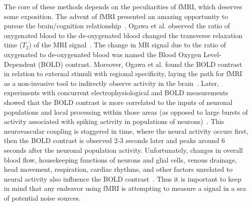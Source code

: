 \documentclass[phd,figures,tables,ackpage,abstractpage,publicabstractpage]{uithesis}
\begin{document}
The core of these methods depends on the peculiarities of fMRI, which deserves some exposition.
The advent of fMRI presented an amazing opportunity
to pursue the brain/cognition relationship~\cite{ogawa1990,Ogawa1992}.
Ogawa et al. observed the ratio of oxygenated blood to the de-oxygenated blood changed the transverse
relaxation time ($T_2$) of the MRI signal~\cite{ogawa1990}.
The change in MR signal due to the ratio of oxygenated to de-oxygenated blood was named the
Blood Oxygen Level-Dependent (BOLD) contrast. 
Moreover, Ogawa et al. found the BOLD contrast in
relation to external stimuli with regional specificity, laying the path for fMRI as a non-invasive tool
to indirectly observe activity in the brain~\cite{Ogawa1992}.
Later, experiments with concurrent electrophysiological and BOLD measurements showed that 
the BOLD contrast is more correlated to the inputs of
neuronal populations and local processing within those areas (as opposed to large bursts of activity
associated with spiking activity in populations of neurons)~\cite{Logothetis2001}.
This neurovascular coupling is staggered in time, where the neural activity occurs
first, then the BOLD contrast is observed 2-3 seconds later
and peaks around 6 seconds after the neuronal population activity.
Unfortunately, changes in overall blood flow, housekeeping functions of neurons and glial cells,
venous drainage, head movement, respiration, cardiac rhythms, and other factors unrelated
to neural activity also influence the BOLD contrast~\cite{Attwell2002,Kim2012,Liu2016}.
Thus it is important to keep in mind that any endeavor using fMRI is attempting to measure
a signal in a sea of potential noise sources.
\end{document}
